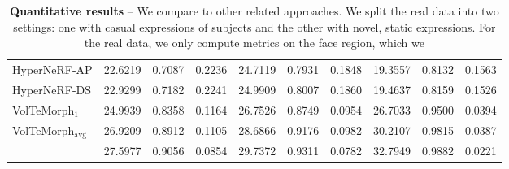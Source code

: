 \begin{table*}[!t]
{\begin{tabular}{lccccccccc}
      HyperNeRF-AP \cite{park2021hypernerf}              & 22.6219                                & 0.7087                                   & 0.2236                                   & 24.7119                            & 0.7931                            & 0.1848                            & 19.3557                            & 0.8132                            & 0.1563                            \\
      HyperNeRF-DS \cite{park2021hypernerf}              & 22.9299                                & 0.7182                                   & 0.2241                                   & 24.9909                            & 0.8007                            & 0.1860                            & 19.4637                            & 0.8159                            & 0.1526                            \\
      \midrule
      VolTeMorph$_1$ \cite{garbin2024voltemorph}         & 24.9939                                & 0.8358                                   & 0.1164                                   & 26.7526                            & 0.8749                            & \cellcolor{secondbestcolor}0.0954 & 26.7033                            & 0.9500                            & 0.0394                            \\
      VolTeMorph$_\text{avg}$\cite{garbin2024voltemorph} & \cellcolor{secondbestcolor}26.9209     & \cellcolor{secondbestcolor}0.8912        & \cellcolor{secondbestcolor}0.1105        & \cellcolor{secondbestcolor}28.6866 & \cellcolor{secondbestcolor}0.9176 & 0.0982                            & \cellcolor{secondbestcolor}30.2107 & \cellcolor{secondbestcolor}0.9815 & \cellcolor{secondbestcolor}0.0387 \\
      \midrule
      \textbf{\methodname{}}                             & \cellcolor{firstbestcolor}27.5977      & \cellcolor{firstbestcolor}0.9056         & \cellcolor{firstbestcolor}0.0854         & \cellcolor{firstbestcolor}29.7372  & \cellcolor{firstbestcolor}0.9311  & \cellcolor{firstbestcolor}0.0782  & \cellcolor{firstbestcolor}32.7949  & \cellcolor{firstbestcolor}0.9882  & \cellcolor{firstbestcolor}0.0221  \\
      \bottomrule
    \end{tabular}
  }
  \caption{\textbf{Quantitative results} --
    We compare \blendfields to other related approaches.
    We split the real data into two settings: one with casual expressions of
    subjects and the other with novel, static expressions.
    For the real data, we only compute metrics on the face region, which we
}
\end{table*}
